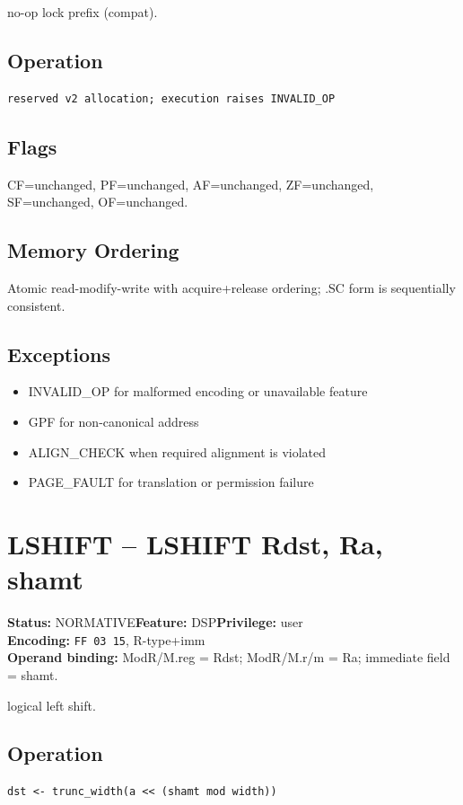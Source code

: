 \documentclass[10pt]{article}
\begin{document}
no-op lock prefix (compat).

\subsection*{Operation}
\begin{lstlisting}
reserved v2 allocation; execution raises INVALID_OP
\end{lstlisting}
\subsection*{Flags}
CF=unchanged, PF=unchanged, AF=unchanged, ZF=unchanged, SF=unchanged, OF=unchanged.
\subsection*{Memory Ordering}
Atomic read-modify-write with acquire+release ordering; .SC form is sequentially consistent.
\subsection*{Exceptions}
\begin{itemize}
\item INVALID\_OP for malformed encoding or unavailable feature
\item GPF for non-canonical address
\item ALIGN\_CHECK when required alignment is violated
\item PAGE\_FAULT for translation or permission failure
\end{itemize}
\clearpage

\section{LSHIFT -- LSHIFT Rdst, Ra, shamt}
\textbf{Status:} NORMATIVE\quad \textbf{Feature:} DSP\quad \textbf{Privilege:} user\\
\textbf{Encoding:} \texttt{FF 03 15}, R-type+imm\\
\textbf{Operand binding:} ModR/M.reg = Rdst; ModR/M.r/m = Ra; immediate field = shamt.

logical left shift.

\subsection*{Operation}
\begin{lstlisting}
dst <- trunc_width(a << (shamt mod width))
\end{lstlisting}
\end{document}
